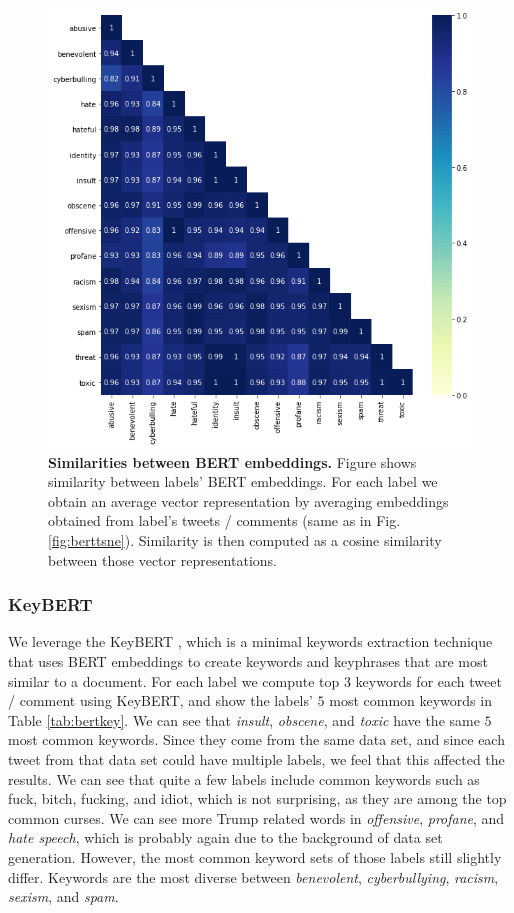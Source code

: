 \documentclass[fleqn,moreauthors,10pt]{ds_report}
\begin{document}
\begin{figure}[htb]\centering
	\includegraphics[width=0.9\linewidth]{bert_sim1.png}
	\caption{\textbf{Similarities between BERT embeddings.} Figure shows similarity between labels' BERT embeddings. For each label we obtain an average vector representation by averaging embeddings obtained from label's tweets / comments (same as in Fig. \ref{fig:berttsne}). Similarity is  then computed as a cosine similarity between those vector representations.}
	\label{fig:bertsim1}
\end{figure}

\subsubsection{KeyBERT}
We leverage the KeyBERT \cite{grootendorst2020keybert}, which is a minimal keywords extraction technique that uses BERT embeddings to create keywords and keyphrases that are most similar to a document. For each label we compute top $3$ keywords for each tweet / comment using KeyBERT, and show the labels' $5$ most common keywords in Table \ref{tab:bertkey}. We can see that \textit{insult}, \textit{obscene}, and \textit{toxic} have the same $5$ most common keywords. Since they come from the same data set, and since each tweet from that data set could have multiple labels, we feel that this affected the results. We can see that quite a few labels include common keywords such as fuck, bitch, fucking, and idiot, which is not surprising, as they are among the top common curses. We can see more Trump related words in \textit{offensive}, \textit{profane}, and \textit{hate speech}, which is probably again due to the background of data set generation. However, the most common keyword sets of those labels still slightly differ. Keywords are the most diverse between \textit{benevolent}, \textit{cyberbullying}, \textit{racism}, \textit{sexism}, and \textit{spam}.
\end{document}
